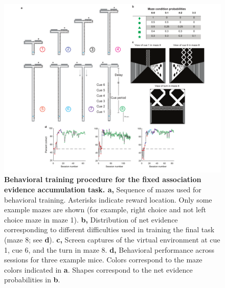 \begin{figure}
\includegraphics[width=\textwidth]{figures/fig_2_3.pdf}
\caption[Behavioral training procedure for the fixed association evidence accumulation task]{\textbf{Behavioral training procedure for the fixed association evidence accumulation task. a,}
Sequence of mazes used for behavioral training. Asterisks indicate reward location. Only some example mazes are shown (for example, right choice and not left choice maze in maze 1). 
%
\textbf{b,} Distribution of net evidence corresponding to different difficulties used in training the final task (maze 8; see \textbf{d}). 
%
\textbf{c,} Screen captures of the virtual environment at cue 1, cue 6, and the turn in maze 8. 
%
\textbf{d,} Behavioral performance across sessions for three example mice. Colors correspond to the maze colors indicated in \textbf{a}. Shapes correspond to the net evidence probabilities in \textbf{b}.
\label{fig:2_3}}
\end{figure}


